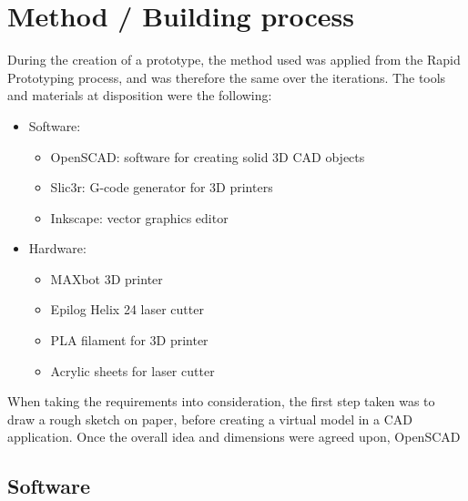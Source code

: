 \section{Method / Building process}

During the creation of a prototype, the method used was applied from the Rapid Prototyping process, and was therefore the same over the iterations. The tools and materials at disposition were the following:

\begin{itemize} \itemsep0em
	\item Software:
		\begin{itemize}
	  		\item OpenSCAD: software for creating solid 3D CAD objects
  			\item Slic3r: G-code generator for 3D printers
  			\item Inkscape: vector graphics editor
		\end{itemize}

	\item Hardware:
		\begin{itemize}
	  		\item MAXbot 3D printer
	  		\item Epilog Helix 24 laser cutter
	  		\item PLA filament for 3D printer
	  		\item Acrylic sheets for laser cutter
		\end{itemize}  				
\end{itemize}

When taking the requirements into consideration, the first step taken was to draw a rough sketch on paper, before creating a virtual model in a CAD application. Once the overall idea and dimensions were agreed upon, OpenSCAD 

\subsection{Software}




